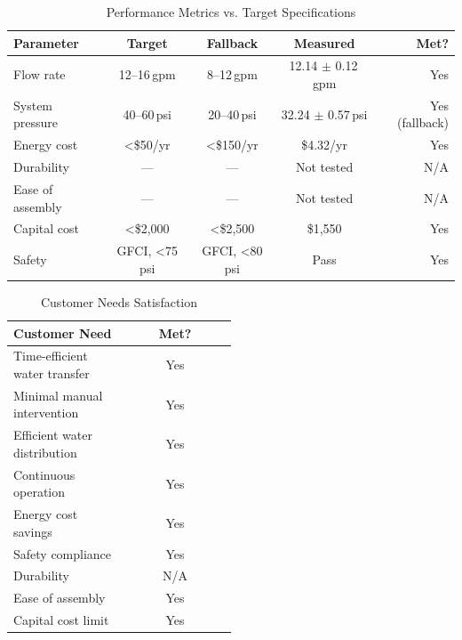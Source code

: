 \begin{table}[H]
  \centering
  \caption{Performance Metrics vs. Target Specifications}
  \label{tab:performance}
  \begin{tabular}{lcccr}
    \toprule
    Parameter & Target & Fallback & Measured & Met? \\
    \midrule
    Flow rate      & 12--16\,gpm & 8--12\,gpm    & 12.14 $\pm$ 0.12\,gpm & Yes \\
    System pressure & 40--60\,psi & 20--40\,psi  & 32.24 $\pm$ 0.57\,psi & Yes (fallback) \\
    Energy cost    & \textless \$50/yr    & \textless \$150/yr     & \$4.32/yr              & Yes \\
    Durability     & —           & —             & Not tested             & N/A \\
    Ease of assembly & —         & —             & Not tested             & N/A \\
    Capital cost   & \textless \$2{,}000 & \textless \$2{,}500     & \$1,550                & Yes \\
    Safety         & GFCI, \textless 75 psi & GFCI, \textless 80 psi & Pass           & Yes \\
    \bottomrule
  \end{tabular}
\end{table}

\begin{table}[H]
  \centering
  \caption{Customer Needs Satisfaction}
  \label{tab:needs}
  \begin{tabular}{p{0.5\linewidth}c}
    \toprule
    \textbf{Customer Need} & \textbf{Met?} \\
    \midrule
    Time-efficient water transfer   & Yes \\
    Minimal manual intervention     & Yes \\
    Efficient water distribution    & Yes \\
    Continuous operation            & Yes \\
    Energy cost savings             & Yes \\
    Safety compliance               & Yes \\
    Durability                      & N/A \\
    Ease of assembly                & Yes \\
    Capital cost limit              & Yes \\
    \bottomrule
  \end{tabular}
\end{table}

